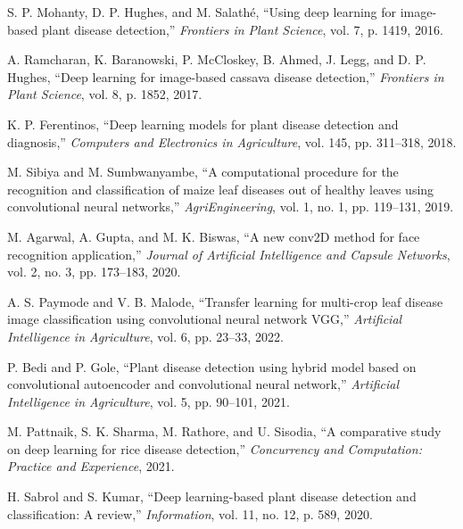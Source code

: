 \documentclass[12pt,a4paper]{report}
\begin{document}
\begin{enumerate}[label={[\arabic*]}]

    \item S. P. Mohanty, D. P. Hughes, and M. Salathé, ``Using deep learning for image-based plant disease detection,'' \textit{Frontiers in Plant Science}, vol. 7, p. 1419, 2016.

    \item A. Ramcharan, K. Baranowski, P. McCloskey, B. Ahmed, J. Legg, and D. P. Hughes, ``Deep learning for image-based cassava disease detection,'' \textit{Frontiers in Plant Science}, vol. 8, p. 1852, 2017.

    \item K. P. Ferentinos, ``Deep learning models for plant disease detection and diagnosis,'' \textit{Computers and Electronics in Agriculture}, vol. 145, pp. 311--318, 2018.

    \item M. Sibiya and M. Sumbwanyambe, ``A computational procedure for the recognition and classification of maize leaf diseases out of healthy leaves using convolutional neural networks,'' \textit{AgriEngineering}, vol. 1, no. 1, pp. 119--131, 2019.

    \item M. Agarwal, A. Gupta, and M. K. Biswas, ``A new conv2D method for face recognition application,'' \textit{Journal of Artificial Intelligence and Capsule Networks}, vol. 2, no. 3, pp. 173--183, 2020.

    \item A. S. Paymode and V. B. Malode, ``Transfer learning for multi-crop leaf disease image classification using convolutional neural network VGG,'' \textit{Artificial Intelligence in Agriculture}, vol. 6, pp. 23--33, 2022.

    \item P. Bedi and P. Gole, ``Plant disease detection using hybrid model based on convolutional autoencoder and convolutional neural network,'' \textit{Artificial Intelligence in Agriculture}, vol. 5, pp. 90--101, 2021.

    \item M. Pattnaik, S. K. Sharma, M. Rathore, and U. Sisodia, ``A comparative study on deep learning for rice disease detection,'' \textit{Concurrency and Computation: Practice and Experience}, 2021.

    \item H. Sabrol and S. Kumar, ``Deep learning-based plant disease detection and classification: A review,'' \textit{Information}, vol. 11, no. 12, p. 589, 2020.


\end{enumerate}
\end{document}
